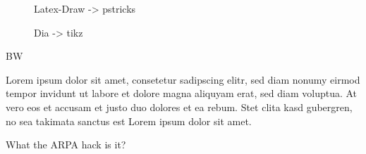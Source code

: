 
\begin{figure}
    \begin{center}
    
    \caption{Latex-Draw -> pstricks}
    \label{pic:pstricks} 
    \end{center}
\end{figure}

\begin{figure}
    \begin{center}
    
    \caption{Dia -> tikz}
    \label{pic:tikz} 
    \end{center}
\end{figure}

\ac{BW}

Lorem ipsum dolor sit amet, consetetur sadipscing elitr, sed diam nonumy eirmod
tempor invidunt ut labore et dolore magna aliquyam erat, sed diam voluptua. At
vero eos et accusam et justo duo dolores et ea rebum. Stet clita kasd gubergren,
no sea takimata sanctus est Lorem ipsum dolor sit amet.

What the \ac{ARPA} hack is it?
